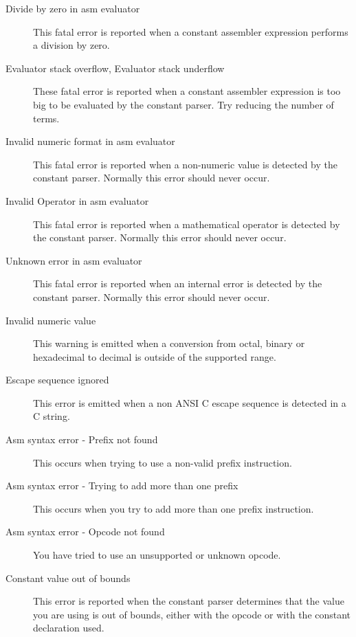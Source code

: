 \begin{description}
\item [Divide by zero in asm evaluator]
This fatal error is reported when a constant assembler expression
performs a division by zero.

\item [Evaluator stack overflow, Evaluator stack underflow]
These fatal error is reported when a constant assembler expression
is too big to be evaluated by the constant parser. Try reducing the
number of terms.

\item [Invalid numeric format in asm evaluator]
This fatal error is reported when a non-numeric value is detected
by the constant parser. Normally this error should never occur.

\item [Invalid Operator in asm evaluator]
This fatal error is reported when a mathematical operator is detected
by the constant parser. Normally this error should never occur.

\item [Unknown error in asm evaluator]
This fatal error is reported when an internal error is detected
by the constant parser. Normally this error should never occur.

\item [Invalid numeric value]
This warning is emitted when a conversion from octal, binary 
or hexadecimal to decimal is outside of the supported range.

\item [Escape sequence ignored]
This error is emitted when a non ANSI C escape sequence is detected in
a C string.

\item [Asm syntax error - Prefix not found]
This occurs when trying to use a non-valid prefix instruction.

\item [Asm syntax error - Trying to add more than one prefix]
This occurs when you try to add more than one prefix instruction.

\item [Asm syntax error - Opcode not found]
You have tried to use an unsupported or unknown opcode.

\item [Constant value out of bounds]
This error is reported when the constant parser determines that the
value you are using is out of bounds, either with the opcode or with
the constant declaration used.


\end{description}
